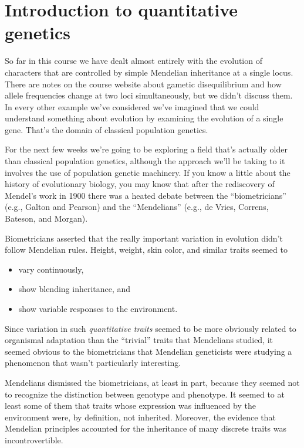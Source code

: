 \chapter{Introduction to quantitative genetics}

So far in this course we have dealt almost entirely with the evolution
of characters that are controlled by simple Mendelian inheritance at a
single locus. There are notes on the course website about gametic
disequilibrium and how allele frequencies change at two loci
simultaneously, but we didn't discuss them. In every other example
we've considered we've imagined that we could understand something
about evolution by examining the evolution of a single gene. That's
the domain of classical population genetics.

For the next few weeks we're going to be exploring a field that's
actually older than classical population genetics, although the
approach we'll be taking to it involves the use of population genetic
machinery. If you know a little about the history of evolutionary
biology, you may know that after the rediscovery of Mendel's work in
1900 there was a heated debate between the ``biometricians'' (e.g.,
Galton and Pearson) and the ``Mendelians'' (e.g., de Vries, Correns,
Bateson, and Morgan).

Biometricians asserted that the really important variation in
evolution didn't follow Mendelian rules. Height, weight, skin color,
and similar traits seemed to 

\begin{itemize}

\item vary continuously,

\item show blending inheritance, and

\item show variable responses to the environment.

\end{itemize}

\noindent Since variation in such {\it quantitative traits\/} seemed
to be more obviously related to organismal adaptation than the
``trivial'' traits that Mendelians studied, it seemed obvious to the
biometricians that Mendelian geneticists were studying a phenomenon
that wasn't particularly interesting.

Mendelians dismissed the biometricians, at least in part, because they
seemed not to recognize the distinction between genotype and
phenotype. It seemed to at least some of them that traits whose
expression was influenced by the environment were, by definition, not
inherited. Moreover, the evidence that Mendelian principles accounted
for the inheritance of many discrete traits was incontrovertible.

